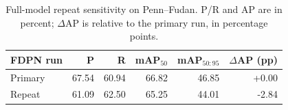 \begin{table}[ht]
\centering
\caption{Full-model repeat sensitivity on Penn--Fudan. P/R and AP are in percent; $\Delta$AP is relative to the primary run, in percentage points.}
\label{tab:repeat_sensitivity}
\footnotesize
\setlength{\tabcolsep}{2.5pt}
\begin{tabular}{lrrrrr}
\toprule
FDPN run & P & R & mAP$_{50}$ & mAP$_{50:95}$ & $\Delta$AP (pp)\\
\midrule
Primary & 67.54 & 60.94 & 66.82 & 46.85 & +0.00\\
Repeat & 61.09 & 62.50 & 65.25 & 44.01 & -2.84\\
\bottomrule
\end{tabular}
\end{table}
